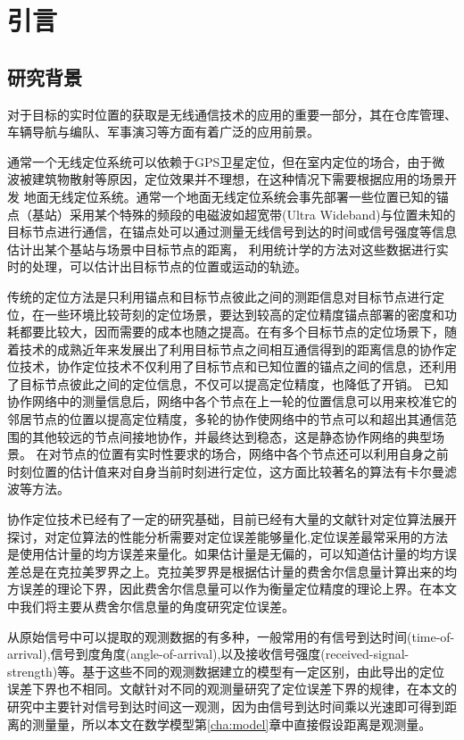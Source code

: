 \chapter{引言}
\label{cha:intro}

\section{研究背景}
对于目标的实时位置的获取是无线通信技术的应用的重要一部分\cite{indoorPos}，其在仓库管理、车辆导航与编队、军事演习等方面有着广泛的应用前景。


通常一个无线定位系统可以依赖于GPS卫星定位，但在室内定位的场合，由于微波被建筑物散射等原因，定位效果并不理想，在这种情况下需要根据应用的场景开发
地面无线定位系统。通常一个地面无线定位系统会事先部署一些位置已知的锚点（基站）采用某个特殊的频段的电磁波如超宽带(Ultra Wideband)与位置未知的目标节点进行通信，在锚点处可以通过测量无线信号到达的时间或信号强度等信息估计出某个基站与场景中目标节点的距离，
利用统计学的方法对这些数据进行实时的处理，可以估计出目标节点的位置或运动的轨迹。


传统的定位方法是只利用锚点和目标节点彼此之间的测距信息对目标节点进行定位，在一些环境比较苛刻的定位场景，要达到较高的定位精度锚点部署的密度和功耗都要比较大，因而需要的成本也随之提高。在有多个目标节点的定位场景下，随着技术的成熟近年来发展出了利用目标节点之间相互通信得到的距离信息的协作定位技术，协作定位技术不仅利用了目标节点和已知位置的锚点之间的信息，还利用了目标节点彼此之间的定位信息，不仅可以提高定位精度，也降低了开销。
已知协作网络中的测量信息后，网络中各个节点在上一轮的位置信息可以用来校准它的邻居节点的位置以提高定位精度，多轮的协作使网络中的节点可以和超出其通信范围的其他较远的节点间接地协作，并最终达到稳态，这是静态协作网络的典型场景。
在对节点的位置有实时性要求的场合，网络中各个节点还可以利用自身之前时刻位置的估计值来对自身当前时刻进行定位，这方面比较著名的算法有卡尔曼滤波\cite{KF}等方法。

协作定位技术已经有了一定的研究基础，目前已经有大量的文献针对定位算法展开探讨，对定位算法的性能分析需要对定位误差能够量化,定位误差最常采用的方法是使用估计量的均方误差来量化。如果估计量是无偏的，可以知道估计量的均方误差总是在克拉美罗界之上\cite{si}。克拉美罗界是根据估计量的费舍尔信息量计算出来的均方误差的理论下界，因此费舍尔信息量可以作为衡量定位精度的理论上界。在本文中我们将主要从费舍尔信息量的角度研究定位误差。

从原始信号中可以提取的观测数据的有多种，一般常用的有信号到达时间(time-of-arrival),信号到度角度(angle-of-arrival),以及接收信号强度(received-signal-strength)等。基于这些不同的观测数据建立的模型有一定区别，由此导出的定位误差下界也不相同。文献\cite{LimitBound}针对不同的观测量研究了定位误差下界的规律，在本文的研究中主要针对信号到达时间这一观测，因为由信号到达时间乘以光速即可得到距离的测量量，所以本文在数学模型第\ref{cha:model}章中直接假设距离是观测量。

